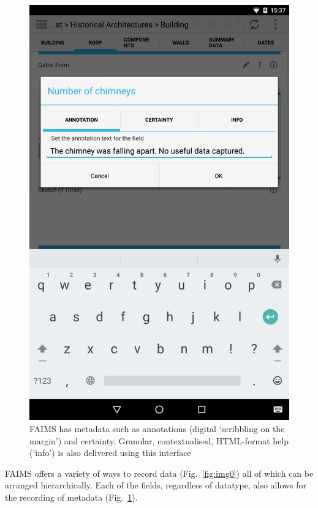 \documentclass[preprint,12pt, a4paper]{elsarticle}
\begin{document}
\begin{figure}[!htb]
	\includegraphics[width=\linewidth]{image-1.jpg}
	\caption{FAIMS has metadata such as annotations (digital `scribbling on the margin') and certainty. Granular, contextualised, HTML-format help (`info') is also delivered using this interface}
	\label{fig:img1}
\endminipage\hfill

\end{figure}

FAIMS offers a variety of ways to record data (Fig.~\ref{fig:img0}) all of which can be arranged hierarchically. Each of the fields, regardless of datatype, also allows for the recording of metadata (Fig.~\ref{fig:img1}).
\end{document}
